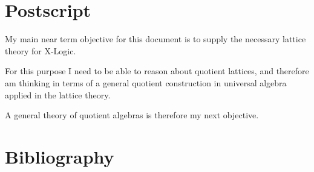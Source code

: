 
\section{Postscript}\label{POSTSCRIPT}

My main near term objective for this document is to supply the necessary lattice theory for X-Logic.

For this purpose I need to be able to reason about quotient lattices, and therefore am thinking in terms of a general quotient construction in universal algebra applied in the lattice theory.

A general theory of quotient algebras is therefore my next objective.

\appendix

\vfill

%



\pagebreak

\section*{Bibliography}\label{BIBLIOGRAPHY}

{\def\section*#1{\ignore{#1}}
\raggedright


} %

{
{\small\printindex}}


